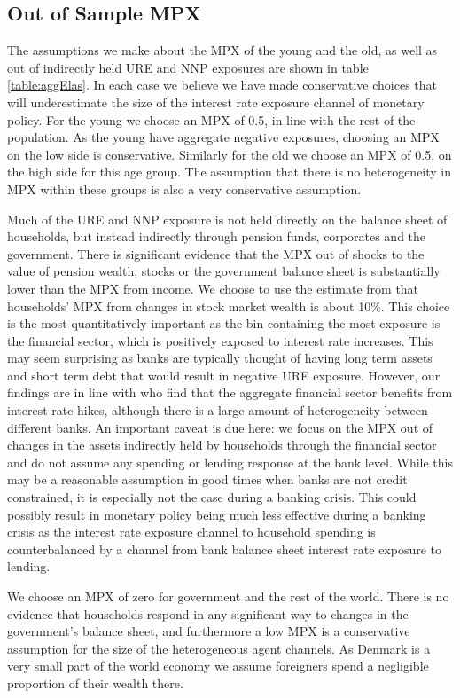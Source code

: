 \documentclass[titlepage]{\econtex}\newcommand{\texname}{ConsumptionHeterogeneity}
\begin{document}
\subsection{Out of Sample MPX}
The assumptions we make about the MPX of the young and the old, as well as out of indirectly held URE and NNP exposures are shown in table \ref{table:aggElas}. In each case we believe we have made conservative choices that will underestimate the size of the interest rate exposure channel of monetary policy. For the young we choose an MPX of 0.5, in line with the rest of the population. As the young have aggregate negative exposures, choosing an MPX on the low side is conservative. Similarly for the old we choose an MPX of 0.5, on the high side for this age group. The assumption that there is no heterogeneity in MPX within these groups is also a very conservative assumption.

Much of the URE and NNP exposure is not held directly on the balance sheet of households, but instead indirectly through pension funds, corporates and the government. There is significant evidence that the MPX out of shocks to the value of pension wealth, stocks or the government balance sheet is substantially lower than the MPX from income. We choose to use the estimate from \cite{maggio_stock_2018} that households' MPX from changes in stock market wealth is about 10\%. This choice is the most quantitatively important as the bin containing the most exposure is the financial sector, which is positively exposed to interest rate increases. This may seem surprising as banks are typically thought of having long term assets and short term debt that would result in negative URE exposure. However, our findings are in line with \cite{landier_banks_2013} who find that the aggregate financial sector benefits from interest rate hikes, although there is a large amount of heterogeneity between different banks. An important caveat is due here: we focus on the MPX out of changes in the assets indirectly held by households through the financial sector and do not assume any spending or lending response at the bank level. While this may be a reasonable assumption in good times when banks are not credit constrained, it is especially not the case during a banking crisis. This could possibly result in monetary policy being much less effective during a banking crisis as the interest rate exposure channel to household spending is counterbalanced by a channel from bank balance sheet interest rate exposure to lending. 

We choose an MPX of zero for government and the rest of the world. There is no evidence that households respond in any significant way to changes in the government's balance sheet, and furthermore a low MPX is a conservative assumption for the size of the heterogeneous agent channels. As Denmark is a very small part of the world economy we assume foreigners spend a negligible proportion of their wealth there.
\begin{center}
	\label{table:aggElas}
	
\end{center}
\end{document}
